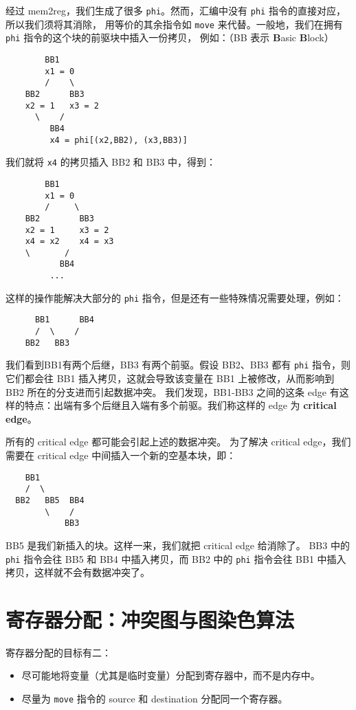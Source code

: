 经过 mem2reg，我们生成了很多 \texttt{phi}。然而，汇编中没有 \texttt{phi} 指令的直接对应，所以我们须将其消除，
用等价的其余指令如 \texttt{move} 来代替。一般地，我们在拥有 \texttt{phi} 指令的这个块的前驱块中插入一份拷贝，
例如：（BB 表示 \textbf{B}asic \textbf{B}lock）
\begin{lstlisting}
        BB1
        x1 = 0
        /    \
    BB2      BB3
    x2 = 1   x3 = 2
      \    /
         BB4
         x4 = phi[(x2,BB2), (x3,BB3)]
\end{lstlisting}

我们就将 \texttt{x4} 的拷贝插入 BB2 和 BB3 中，得到：
\begin{lstlisting}
        BB1
        x1 = 0
        /     \
    BB2        BB3
    x2 = 1     x3 = 2
    x4 = x2    x4 = x3
    \       /
           BB4
         ...
\end{lstlisting}

这样的操作能解决大部分的 \texttt{phi} 指令，但是还有一些特殊情况需要处理，例如：
\begin{lstlisting}
      BB1      BB4
      /  \    /
    BB2   BB3
\end{lstlisting}

我们看到BB1有两个后继，BB3 有两个前驱。假设 BB2、BB3 都有 \texttt{phi} 指令，则它们都会往
BB1 插入拷贝，这就会导致该变量在 BB1 上被修改，从而影响到 BB2 所在的分支进而引起数据冲突。
我们发现，BB1-BB3 之间的这条 edge 有这样的特点：出端有多个后继且入端有多个前驱。我们称这样的
edge 为 \textbf{critical edge}。

所有的 critical edge 都可能会引起上述的数据冲突。
为了解决 critical edge，我们需要在 critical edge 中间插入一个新的空基本块，即：
\begin{lstlisting}
    BB1    
    /  \       
  BB2   BB5  BB4
        \    /   
            BB3     
\end{lstlisting}

BB5 是我们新插入的块。这样一来，我们就把 critical edge 给消除了。
BB3 中的 \texttt{phi} 指令会往 BB5 和 BB4 中插入拷贝，而 BB2 中的 \texttt{phi} 指令会往
BB1 中插入拷贝，这样就不会有数据冲突了。

\section{寄存器分配：冲突图与图染色算法}

寄存器分配的目标有二：
\begin{itemize}
    \item 尽可能地将变量（尤其是临时变量）分配到寄存器中，而不是内存中。
    \item 尽量为 \texttt{move} 指令的 source 和 destination 分配同一个寄存器。
\end{itemize}

